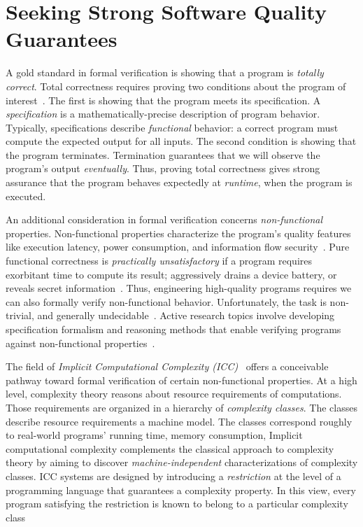 \section{Seeking Strong Software Quality Guarantees}
\label{sec:aicc-intro}

A gold standard in formal verification is showing that a program is \emph{totally correct}.
Total correctness requires proving two conditions about the program of interest~\cite{leino2023}.
The first is showing that the program meets its specification.
A \emph{specification} is a mathematically-precise description of program behavior.
Typically, specifications describe \emph{functional} behavior: a correct program must compute the expected output for all inputs.
The second condition is showing that the program terminates.
Termination guarantees that we will observe the program's output \emph{eventually}.
Thus, proving total correctness gives strong assurance that the program behaves expectedly at \emph{runtime}, when the program is executed.

An additional consideration in formal verification concerns \emph{non-functional} properties.
Non-functional properties characterize the program's quality features like execution latency, power consumption, and information flow security~\cite{terbeek2018}.
Pure functional correctness is \emph{practically unsatisfactory} if a program requires exorbitant time to compute its result;
aggressively drains a device battery, or reveals secret information~\cite{heraud2011,aubert20222}.
Thus, engineering high-quality programs requires we can also formally verify non-functional behavior.
Unfortunately, the task is non-trivial, and generally undecidable~\cite{rice1953}.
Active research topics involve developing specification formalism and reasoning methods that enable verifying programs against non-functional properties~\cite{etaps2025}.

The field of \emph{Implicit Computational Complexity (ICC)}~\cite{dallago2011} offers a conceivable pathway toward formal verification of certain non-functional properties.
At a high level, complexity theory reasons about resource requirements of computations.
Those requirements are organized in a hierarchy of \emph{complexity classes}.
The classes describe resource requirements \wrt a machine model.
The classes correspond roughly to real-world programs' running time, memory consumption, \etc
Implicit computational complexity complements the classical approach to complexity theory by aiming to discover \emph{machine-independent} characterizations of complexity classes.
ICC systems are designed by introducing a \emph{restriction} at the level of a programming language that guarantees a complexity property.
In this view, every program satisfying the restriction is known to belong to a particular complexity class~\cite{pchoux2020}%

